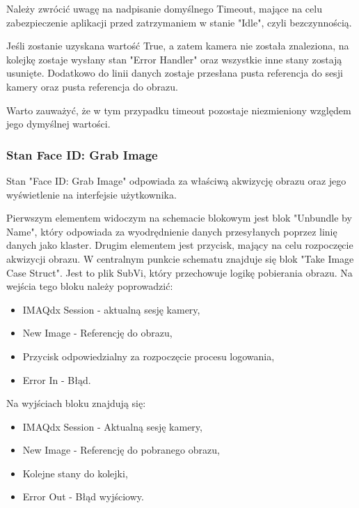\documentclass{report}
\begin{document}
Należy zwrócić uwagę na nadpisanie domyślnego Timeout, mające na celu zabezpieczenie aplikacji przed zatrzymaniem w stanie "Idle", czyli bezczynnością.

Jeśli zostanie uzyskana wartość True, a zatem kamera nie została znaleziona, na kolejkę zostaje wysłany stan "Error Handler" oraz wszystkie inne stany zostają usunięte. 
Dodatkowo do linii danych zostaje przesłana pusta referencja do sesji kamery oraz pusta referencja do obrazu. 

Warto zauważyć, że w tym przypadku timeout pozostaje niezmieniony względem jego dymyślnej wartości. 

%

\subsubsection{\large Stan Face ID: Grab Image}

Stan "Face ID: Grab Image" odpowiada za właściwą akwizycję obrazu oraz jego wyświetlenie na interfejsie użytkownika. 

Pierwszym elementem widoczym na schemacie blokowym jest blok "Unbundle by Name", który odpowiada za wyodrędnienie danych przesyłanych poprzez linię danych jako klaster. Drugim elementem jest przycisk, mający na celu rozpoczęcie akwizycji obrazu. W centralnym punkcie schematu znajduje się blok "Take Image Case Struct". Jest to plik SubVi, który przechowuje logikę pobierania obrazu. Na wejścia tego bloku należy poprowadzić:
\begin{itemize}
    \item IMAQdx Session - aktualną sesję kamery,
    \item New Image - Referencję do obrazu,
    \item Przycisk odpowiedzialny za rozpoczęcie procesu logowania,
    \item Error In - Błąd.
\end{itemize}

Na wyjściach bloku znajdują się:
\begin{itemize}
    \item IMAQdx Session - Aktualną sesję kamery,
    \item New Image - Referencję do pobranego obrazu,
    \item Kolejne stany do kolejki,
    \item Error Out - Błąd wyjściowy.
\end{itemize}
\end{document}
